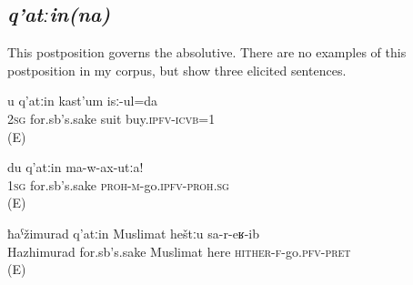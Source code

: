 
\subsection{\textit{q'atːin(na)} }
\label{ssec:postposition qatinna}

This postposition governs the absolutive. There are no examples of this postposition in my corpus, but  show three elicited sentences.

\begin{exe}
	\ex
	\begin{xlist}
		\ex	\label{Because of you I bought a suit}
		\gll	u	q'atːin	kast'um	isː-ul=da\\
			2\textsc{sg}	for.sb's.sake	suit	buy.\textsc{ipfv}-\textsc{icvb}=1\\
		\glt	{} (E)

		\ex	\label{For my sake do not go}
		\gll	du	q'atːin	ma-w-ax-utːa!\\
			1\textsc{sg}	for.sb's.sake	\textsc{proh}-\textsc{m}-go.\textsc{ipfv}-\textsc{proh}.\textsc{sg}\\
		\glt	{} (E)

		\ex	\label{For the sake of Hazhimurad, Muslimat came here}
		\gll	ħaˁžimurad	q'atːin	Muslimat	heštːu	sa-r-eʁ-ib\\
			Hazhimurad	for.sb's.sake	Muslimat	here	\textsc{hither}-\textsc{f}-go.\textsc{pfv}-\textsc{pret}\\
		\glt	{} (E)
	\end{xlist}
\end{exe}



\subsection{ }
\label{ssec:postposition hasible}

